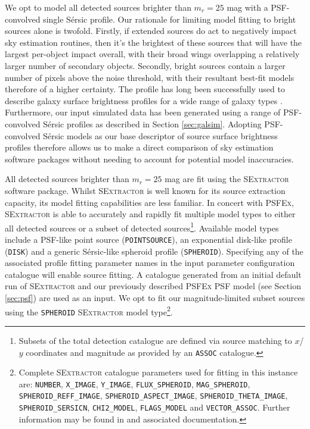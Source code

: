 \documentclass[fleqn,usenatbib,useAMS]{mnras}
\newcommand*{\Sersic}{S\'{e}rsic\xspace}
\newcommand*{\SExtractor}{\textsc{SExtractor}\xspace}
\newcommand*{\PSFEx}{\textsc{PSFEx}\xspace}
\begin{document}
We opt to model all detected sources brighter than $m_r=25$ mag with a PSF-convolved single \Sersic profile. Our rationale for limiting model fitting to bright sources alone is twofold. Firstly, if extended sources do act to negatively impact sky estimation routines, then it's the brightest of these sources that will have the largest per-object impact overall, with their broad wings overlapping a relatively larger number of secondary objects. Secondly, bright sources contain a larger number of pixels above the noise threshold, with their resultant best-fit models therefore of a higher certainty. The \citet{Sersic1963,Sersic1968} profile has long been successfully used to describe galaxy surface brightness profiles for a wide range of galaxy types \citep[e.g.,][]{Caon1993,Trujillo2004,Graham2005a,Hill2011,Simard2011,Kelvin2012,Kelvin2014a,Kelvin2014b}. Furthermore, our input simulated data has been generated using a range of PSF-convolved \Sersic profiles as described in Section \ref{sec:galsim}. Adopting PSF-convolved \Sersic models as our base descriptor of source surface brightness profiles therefore allows us to make a direct comparison of sky estimation software packages without needing to account for potential model inaccuracies.

All detected sources brighter than $m_r=25$ mag are fit using the \SExtractor software package. Whilst \SExtractor is well known for its source extraction capacity, its model fitting capabilities are less familiar. In concert with \PSFEx, \SExtractor is able to accurately and rapidly fit multiple model types to either all detected sources or a subset of detected sources\footnote{Subsets of the total detection catalogue are defined via source matching to $x$/$y$ coordinates and magnitude as provided by an \texttt{ASSOC} catalogue.}. Available model types include a PSF-like point source (\texttt{POINTSOURCE}), an exponential disk-like profile (\texttt{DISK}) and a generic \Sersic-like spheroid profile (\texttt{SPHEROID}). Specifying any of the associated profile fitting parameter names in the input parameter configuration catalogue will enable source fitting. A catalogue generated from an initial default run of \SExtractor and our previously described \PSFEx PSF model (see Section \ref{sec:psf}) are used as an input. We opt to fit our magnitude-limited subset sources using the \texttt{SPHEROID} \SExtractor model type\footnote{Complete \SExtractor catalogue parameters used for fitting in this instance are: \texttt{NUMBER}, \texttt{X\_IMAGE}, \texttt{Y\_IMAGE}, \texttt{FLUX\_SPHEROID}, \texttt{MAG\_SPHEROID}, \texttt{SPHEROID\_REFF\_IMAGE}, \texttt{SPHEROID\_ASPECT\_IMAGE}, \texttt{SPHEROID\_THETA\_IMAGE}, \texttt{SPHEROID\_SERSICN}, \texttt{CHI2\_MODEL}, \texttt{FLAGS\_MODEL} and \texttt{VECTOR\_ASSOC}. Further information may be found in \citet{Bertin1996} and associated documentation.}.
\end{document}
